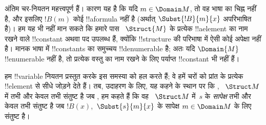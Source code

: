 \documentclass[../../../include/open-logic-section]{subfiles}
\begin{document}
\begin{explain}
अंतिम  चर-नियतन महत्त्वपूर्ण
हैं। कारण यह है कि यदि $m \in
\Domain M$, तो वह भाषा का चिह्न नहीं
है, और इसलिए $!B(m)$ कोई !!a{formula} नहीं है (अर्थात्
$\Subst{!B}{m}{x}$ अपरिभाषित है)। हम यह भी नहीं मान सकते कि हमारे पास
~$\Struct{M}$ के प्रत्येक !!a{element} का नाम रखने वाले !!{constant} अथवा
पद उपलब्ध हैं, क्योंकि !!{structure} की परिभाषा में ऐसी कोई अपेक्षा नहीं
है। मानक भाषा में !!{constant}s का समुच्चय !!{denumerable} है; अतः यदि
$\Domain{M}$ !!{enumerable} नहीं है, तो प्रत्येक वस्तु का नाम रखने के लिए
पर्याप्त !!{constant} भी नहीं हैं।

हम !!{variable} नियतन प्रस्तुत करके इस समस्या को हल करते हैं; वे हमें चरों को प्रांत
के प्रत्येक !!{element} से सीधे जोड़ने देते हैं। तब, उदाहरण के लिए, यह कहने के
स्थान पर कि ,
~$\Struct M$ में तभी और केवल तभी संतुष्ट है जब
, हम कहते हैं कि वह
~$\Struct M$ में~$s$ के \emph{सापेक्ष} तभी और केवल तभी संतुष्ट है जब
$!B(x)$,~$\Subst{s}{m}{x}$ के सापेक्ष
 $m \in \Domain M$ के लिए संतुष्ट है।
\end{explain}
\end{document}
